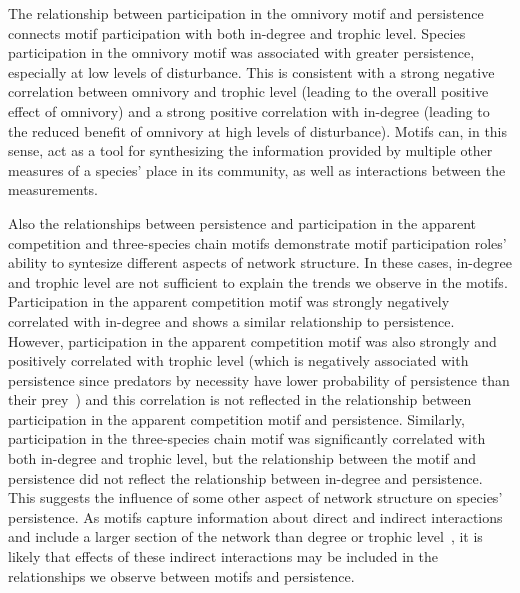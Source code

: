 \documentclass[12pt]{article}
\begin{document}
\begin{spacing}{2.0}
The relationship between participation in the omnivory motif and persistence connects motif participation with both in-degree and trophic level.
Species participation in the omnivory motif was associated with greater persistence, especially at low levels of disturbance.
This is consistent with a strong negative correlation between omnivory and trophic level (leading to the overall positive effect of omnivory) and a strong positive correlation with in-degree (leading to the reduced benefit of omnivory at high levels of disturbance). 
Motifs can, in this sense, act as a tool for synthesizing the information provided by multiple other measures of a species' place in its community, as well as interactions between the measurements.


Also the relationships between persistence and participation in the apparent competition and three-species chain motifs demonstrate motif participation roles' ability to syntesize different aspects of network structure.
In these cases, in-degree and trophic level are not sufficient to explain the trends we observe in the motifs.
Participation in the apparent competition motif was strongly negatively correlated with in-degree and shows a similar relationship to persistence.
However, participation in the apparent competition motif was also strongly and positively correlated with trophic level (which is negatively associated with persistence since predators by necessity have lower probability of persistence than their prey~\citep{Eklof2013}) and this correlation is not reflected in the relationship between participation in the apparent competition motif and persistence.
Similarly, participation in the three-species chain motif was significantly correlated with both in-degree and trophic level, but the relationship between the motif and persistence did not reflect the relationship between in-degree and persistence.
This suggests the influence of some other aspect of network structure on species' persistence.
As motifs capture information about direct and indirect interactions and include a larger section of the network than degree or trophic level~\citep{Cirtwill2018FoodWebs}, it is likely that effects of these indirect interactions may be included in the relationships we observe between motifs and persistence.



\end{spacing}
\end{document}
